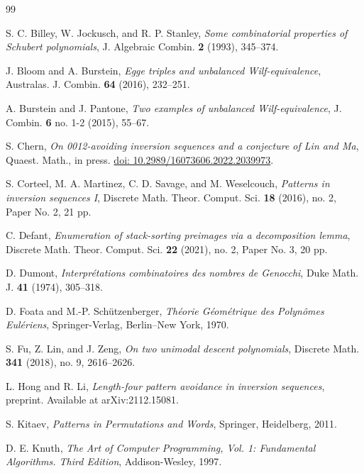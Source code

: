 \documentclass[reqno]{amsart}
\numberwithin{equation}{section}
\theoremstyle{plain}
\theoremstyle{definition}
\theoremstyle{named}
\newcommand{\doi}[1]{\href{http://dx.doi.org/#1}{doi: #1}}
\begin{document}

\begin{thebibliography}{99}

	{\sc S. C. Billey, W. Jockusch, and R. P. Stanley}, {\em Some combinatorial properties of Schubert polynomials}, J. Algebraic Combin. {\bf2} (1993), 345--374.

	{\sc J. Bloom and A. Burstein}, {\em Egge triples and unbalanced Wilf-equivalence}, Australas. J. Combin. {\bf64} (2016), 232--251.

	{\sc A. Burstein and J. Pantone}, {\em Two examples of unbalanced Wilf-equivalence}, J. Combin. {\bf6} no. 1-2 (2015), 55--67.

	{\sc S. Chern}, {\em On 0012-avoiding inversion sequences and a conjecture of Lin and Ma}, Quaest. Math., in press. \doi{10.2989/16073606.2022.2039973}.
	
	{\sc S. Corteel, M. A. Martinez, C. D. Savage, and M. Weselcouch}, {\em Patterns in inversion sequences I}, Discrete Math. Theor. Comput. Sci. {\bf18} (2016), no. 2, Paper No. 2, 21 pp.

	{\sc C. Defant}, {\em Enumeration of stack-sorting preimages via a decomposition lemma}, Discrete Math. Theor. Comput. Sci. {\bf22} (2021), no. 2, Paper No. 3, 20 pp.
	
	{\sc D. Dumont}, {\em Interpr\'etations combinatoires des nombres de Genocchi}, Duke Math. J. {\bf41} (1974), 305--318.

	
	{\sc D. Foata and M.-P. Sch\"utzenberger}, {\em Th\'eorie G\'eom\'etrique des Polyn\^omes Eul\'eriens}, Springer-Verlag, Berlin--New York, 1970.
	
	{\sc S. Fu, Z. Lin, and J. Zeng}, {\em On two unimodal descent polynomials}, Discrete Math. {\bf341} (2018), no. 9, 2616--2626.
	
	{\sc L. Hong and R. Li}, {\em Length-four pattern avoidance in inversion sequences}, preprint. Available at arXiv:2112.15081.
	
	{\sc S. Kitaev}, {\em Patterns in Permutations and Words}, Springer, Heidelberg, 2011.
	
	{\sc D. E. Knuth}, {\em The Art of Computer Programming, Vol. 1: Fundamental Algorithms. Third Edition}, Addison-Wesley, 1997.


\end{thebibliography}
\end{document}
